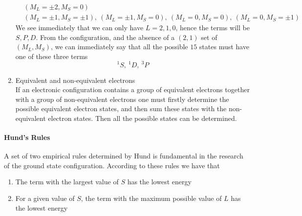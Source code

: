 \documentclass[a4paper, 11pt]{book}
\newcommand{\1}{\opr{\mathds{1}}}
\theoremstyle{plain}
\begin{document}
\begin{enumerate}
		\begin{equation*}
			\begin{aligned}
				&(M_L=\pm2,M_S=0)\\
				&(M_L=\pm1,M_S=\pm1),\ (M_L=\pm1,M_S=0),\ (M_L=0,M_S=0),\ (M_L=0,M_S=\pm1)
			\end{aligned}
		\end{equation*}
		We see immediately that we can only have $L=2,1,0$, hence the terms will be $S,P,D$. From the configuration, and the absence of a $(2,1)$ set of $(M_L,M_S)$, we can immediately say that all the possible $15$ states must have one of these three terms
		\begin{equation*}
			^1S,\ ^1D,\ ^3P
		\end{equation*}
	\item Equivalent and non-equivalent electrons\\
		If an electronic configuration contains a group of equivalent electrons together with a group of non-equivalent electrons one must firstly determine the possible equivalent electron states, and then sum these states with the non-equivalent electron states. Then all the possible states can be determined. %
	\end{enumerate}
	\paragraph{Hund's Rules}
	A set of two empirical rules determined by Hund is fundamental in the research of the ground state configuration. According to these rules we have that
	\begin{enumerate}
	\item The term with the largest value of $S$ has the lowest energy
	\item For a given value of $S$, the term with the maximum possible value of $L$ has the lowest energy
	\end{enumerate}
\end{document}
